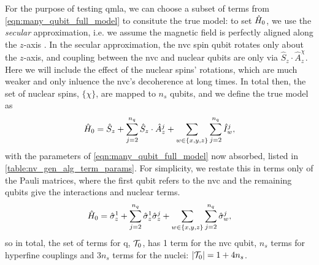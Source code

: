 \par 

For the purpose of testing \gls{qmla}, we can choose a subset of terms from \cref{eqn:many_qubit_full_model} to 
    consitute the \gls{true model}: to set $\hat{H}_0$, we use the \emph{secular} approximation, 
    i.e. we assume the magnetic field is perfectly aligned along the $z$-axis \cite{rowan1965electron}.
In the secular approximation, the \gls{nvc} spin qubit rotates only about the $z$-axis, 
    and coupling between the \gls{nvc} and nuclear qubits are only via $\hat{S}_z \cdot \hat{A}_z^{\chi}$.
Here we will include the effect of the nuclear spins' rotations, which are much weaker and only inluence the \gls{nvc}'s decoherence at long times. 
In total then, the set of nuclear spins, $\{\chi\}$, are mapped to $n_s$ qubits, 
    and we define the \gls{true model} as 
\begin{equation}
    \hat{H}_0 = \hat{S}_z 
    + \sum\limits_{ j=2 }^{n_q} \hat{S}_z \cdot \hat{A}_z^{j} 
    + \sum\limits_{w \in \{x,y,z\}} \sum\limits_{ j=2 }^{n_q} \hat{I}_w^{j},
\end{equation}
    with the parameters of \cref{eqn:many_qubit_full_model} now absorbed, listed in \cref{table:nv_gen_alg_term_params}.
For simplicity, we restate this in terms only of the Pauli matrices,
    where the first qubit refers to the \gls{nvc} and the remaining qubits give the interactions and nuclear terms.
\begin{equation}
    \label{eqn:nv_gen_alg_target}
    \hat{H}_0 = \hat{\sigma}_{z}^1 
    + \sum\limits_{ j=2 }^{n_q} \hat{\sigma}_{z}^1 \hat{\sigma}_{z}^j 
    + \sum\limits_{w \in \{x,y,z\}} \sum\limits_{ j=2 }^{n_q} \hat{\sigma}_w^j,
\end{equation}
    so in total, the set of terms for \gls{q}, $\mathcal{T}_0$, has 1 term for the \gls{nvc} qubit, $n_s$ terms for hyperfine couplings
    and $3n_s$ terms for the nuclei: $\left\lvert \mathcal{T}_0 \right\rvert = 1 + 4n_s$.
\par 

